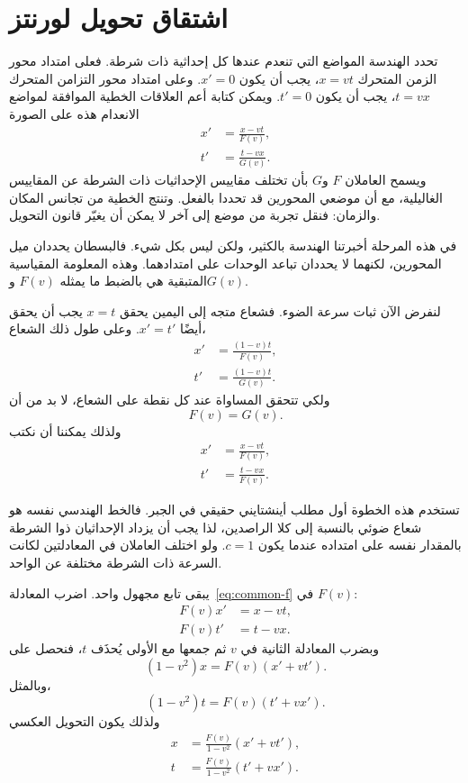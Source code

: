 \section{اشتقاق تحويل لورنتز}

تحدد الهندسة المواضع التي تنعدم عندها كل إحداثية ذات شرطة. فعلى امتداد محور الزمن المتحرك \(x=vt\)، يجب أن يكون \(x'=0\). وعلى امتداد محور التزامن المتحرك \(t=vx\)، يجب أن يكون \(t'=0\). ويمكن كتابة أعم العلاقات الخطية الموافقة لمواضع الانعدام هذه على الصورة
\begin{align}
x'&=\frac{x-vt}{F(v)},\\
t'&=\frac{t-vx}{G(v)}.
\label{eq:fg-ansatz}
\end{align}
ويسمح العاملان \(F\) و\(G\) بأن تختلف مقاييس الإحداثيات ذات الشرطة عن المقاييس الغاليلية، مع أن موضعي المحورين قد تحددا بالفعل. وتنتج الخطية من تجانس المكان والزمان: فنقل تجربة من موضع إلى آخر لا يمكن أن يغيّر قانون التحويل.

في هذه المرحلة أخبرتنا الهندسة بالكثير، ولكن ليس بكل شيء. فالبسطان يحددان ميل المحورين، لكنهما لا يحددان تباعد الوحدات على امتدادهما. وهذه المعلومة المقياسية المتبقية هي بالضبط ما يمثله \(F(v)\) و\(G(v)\).

لنفرض الآن ثبات سرعة الضوء. فشعاع متجه إلى اليمين يحقق \(x=t\) يجب أن يحقق أيضًا \(x'=t'\). وعلى طول ذلك الشعاع،
\begin{align}
x'&=\frac{(1-v)t}{F(v)},\\
t'&=\frac{(1-v)t}{G(v)}.
\end{align}
ولكي تتحقق المساواة عند كل نقطة على الشعاع، لا بد من أن
\begin{equation}
F(v)=G(v).
\end{equation}
ولذلك يمكننا أن نكتب
\begin{align}
x'&=\frac{x-vt}{F(v)},\\
t'&=\frac{t-vx}{F(v)}.
\label{eq:common-f}
\end{align}

تستخدم هذه الخطوة أول مطلب أينشتايني حقيقي في الجبر. فالخط الهندسي نفسه هو شعاع ضوئي بالنسبة إلى كلا الراصدين، لذا يجب أن يزداد الإحداثيان ذوا الشرطة بالمقدار نفسه على امتداده عندما يكون \(c=1\). ولو اختلف العاملان في المعادلتين لكانت السرعة ذات الشرطة مختلفة عن الواحد.

يبقى تابع مجهول واحد. اضرب المعادلة~\eqref{eq:common-f} في \(F(v)\):
\begin{align}
F(v)x'&=x-vt,\\
F(v)t'&=t-vx.
\end{align}
وبضرب المعادلة الثانية في \(v\) ثم جمعها مع الأولى يُحذَف \(t\)، فنحصل على
\begin{equation}
(1-v^2)x=F(v)(x'+vt').
\end{equation}
وبالمثل،
\begin{equation}
(1-v^2)t=F(v)(t'+vx').
\end{equation}
ولذلك يكون التحويل العكسي
\begin{align}
x&=\frac{F(v)}{1-v^2}(x'+vt'),\\
t&=\frac{F(v)}{1-v^2}(t'+vx').
\end{align}

